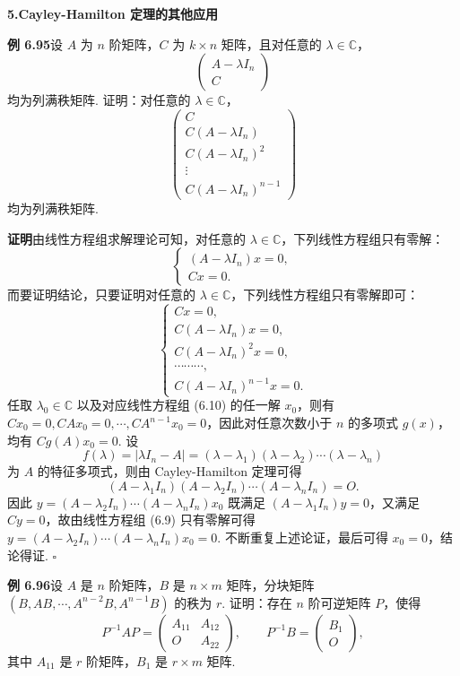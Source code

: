 \documentclass[UTF8,12pt,a4paper,fontset=fandol]{ctexart}
\begin{document}
\noindent\textbf{5.\quad Cayley-Hamilton 定理的其他应用}

\noindent\textbf{例 6.95}\quad 设 $A$ 为 $n$ 阶矩阵，$C$ 为 $k\times n$ 矩阵，且对任意的 $\lambda\in\mathbb{C}$，
\[
\begin{pmatrix} A-\lambda I_n\\ C\end{pmatrix}
\]
均为列满秩矩阵. 证明：对任意的 $\lambda\in\mathbb{C}$，
\[
\begin{pmatrix}
C\\
C(A-\lambda I_n)\\
C(A-\lambda I_n)^2\\
\vdots\\
C(A-\lambda I_n)^{n-1}
\end{pmatrix}
\]
均为列满秩矩阵.

\noindent\textbf{证明}\quad 由线性方程组求解理论可知，对任意的 $\lambda\in\mathbb{C}$，下列线性方程组只有零解：
\begin{equation}
\begin{cases}
(A-\lambda I_n)x=0,\\
Cx=0.
\end{cases} \tag{6.9}
\end{equation}
而要证明结论，只要证明对任意的 $\lambda\in\mathbb{C}$，下列线性方程组只有零解即可：
\begin{equation}
\begin{cases}
Cx=0,\\
C(A-\lambda I_n)x=0,\\
C(A-\lambda I_n)^2x=0,\\
\cdots\cdots\cdots,\\
C(A-\lambda I_n)^{n-1}x=0.
\end{cases} \tag{6.10}
\end{equation}
任取 $\lambda_0\in\mathbb{C}$ 以及对应线性方程组 (6.10) 的任一解 $x_0$，则有 $Cx_0=0,CAx_0=0,\cdots,CA^{n-1}x_0=0$，因此对任意次数小于 $n$ 的多项式 $g(x)$，均有 $Cg(A)x_0=0$. 设
\[
f(\lambda)=|\lambda I_n-A|=(\lambda-\lambda_1)(\lambda-\lambda_2)\cdots(\lambda-\lambda_n)
\]
为 $A$ 的特征多项式，则由 Cayley-Hamilton 定理可得
\[
(A-\lambda_1I_n)(A-\lambda_2I_n)\cdots(A-\lambda_nI_n)=O.
\]
因此 $y=(A-\lambda_2I_n)\cdots(A-\lambda_nI_n)x_0$ 既满足 $(A-\lambda_1I_n)y=0$，又满足 $Cy=0$，故由线性方程组 (6.9) 只有零解可得 $y=(A-\lambda_2I_n)\cdots(A-\lambda_nI_n)x_0=0$. 不断重复上述论证，最后可得 $x_0=0$，结论得证. $\square$

\noindent\textbf{例 6.96}\quad 设 $A$ 是 $n$ 阶矩阵，$B$ 是 $n\times m$ 矩阵，分块矩阵 $(B,AB,\cdots,A^{n-2}B,A^{n-1}B)$ 的秩为 $r$. 证明：存在 $n$ 阶可逆矩阵 $P$，使得
\[
P^{-1}AP=\begin{pmatrix} A_{11}&A_{12}\\ O&A_{22}\end{pmatrix},\qquad
P^{-1}B=\begin{pmatrix} B_1\\ O\end{pmatrix},
\]
其中 $A_{11}$ 是 $r$ 阶矩阵，$B_1$ 是 $r\times m$ 矩阵.
\end{document}
